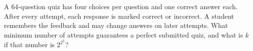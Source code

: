 A 64-question quiz has four choices per question and one correct answer each. After every attempt, each response is marked correct or incorrect. A student remembers the feedback and may change answers on later attempts. What minimum number of attempts guarantees a perfect submitted quiz, and what is $k$ if that number is $2^{2^k}$?
